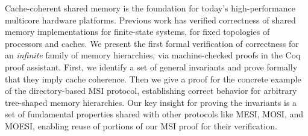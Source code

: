Cache-coherent shared memory is the foundation for today's high-performance
multicore hardware platforms.  Previous work has verified correctness of
shared memory implementations for finite-state systems, for fixed topologies of
processors and caches.  We present the first formal verification of correctness
for an \emph{infinite} family of memory hierarchies, via machine-checked proofs
in the Coq proof assistant.  First, we identify a set of general invariants
and prove formally that they imply cache coherence.  Then we give a proof
for the concrete example of the directory-based MSI protocol, establishing
correct behavior for arbitrary tree-shaped memory hierarchies.
Our key insight for proving the invariants is a set of
fundamental properties shared with other protocols like MESI, MOSI,
and MOESI, enabling reuse of portions of our MSI proof for their verification.
